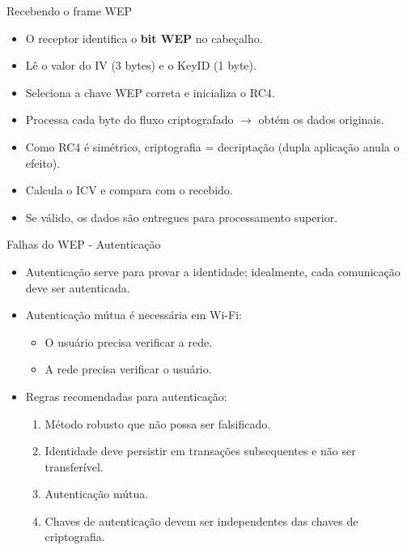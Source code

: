 \begin{frame}{Recebendo o frame WEP}
    \begin{itemize}
        \item O receptor identifica o \textbf{bit WEP} no cabeçalho.
        \item Lê o valor do IV (3 bytes) e o KeyID (1 byte).
        \item Seleciona a chave WEP correta e inicializa o RC4.
        \item Processa cada byte do fluxo criptografado $\rightarrow$ obtém os dados originais.
        \item Como RC4 é simétrico, criptografia = decriptação (dupla aplicação anula o efeito).
        \item Calcula o ICV e compara com o recebido.
        \item Se válido, os dados são entregues para processamento superior.
    \end{itemize}
\end{frame}


\begin{frame}{Falhas do WEP - Autenticação}
    \begin{itemize}
        \item Autenticação serve para provar a identidade; idealmente, cada comunicação deve ser autenticada.
        \item Autenticação mútua é necessária em Wi-Fi:
              \begin{itemize}
                  \item O usuário precisa verificar a rede.
                  \item A rede precisa verificar o usuário.
              \end{itemize}
        \item Regras recomendadas para autenticação:
              \begin{enumerate}
                  \item Método robusto que não possa ser falsificado.
                  \item Identidade deve persistir em transações subsequentes e não ser transferível.
                  \item Autenticação mútua.
                  \item Chaves de autenticação devem ser independentes das chaves de criptografia.
              \end{enumerate}
    \end{itemize}
\end{frame}

